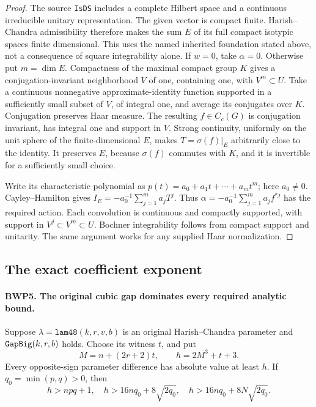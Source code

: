 \documentclass[11pt,a4paper]{article}
\numberwithin{equation}{section}
\theoremstyle{remark}\newtheorem{remark}[theorem]{Remark}
\begin{document}
\begin{proof}
The source \texttt{Is\allowbreak DS} includes a complete Hilbert space and a
continuous irreducible unitary representation.  The given vector is
compact finite.  Harish--Chandra admissibility therefore makes the sum
\(E\) of its full compact isotypic spaces finite dimensional.  This
uses the named inherited foundation stated above, not a consequence
of square integrability alone.  If \(w=0\), take \(\alpha=0\).
Otherwise put \(m=\dim E\).  Compactness of the maximal compact
group \(K\) gives a conjugation-invariant neighborhood \(V\) of
one, containing one, with \(V^m\subset U\).
Take a continuous nonnegative approximate-identity function supported
in a sufficiently small subset of \(V\), of integral one, and
average its conjugates over \(K\).  Conjugation preserves Haar
measure.  The resulting \(f\in C_c(G)\) is conjugation invariant,
has integral one and support in \(V\).  Strong continuity, uniformly
on the unit sphere of the finite-dimensional \(E\), makes
\(T=\sigma(f)|_E\) arbitrarily close to the identity.  It preserves
\(E\), because \(\sigma(f)\) commutes with \(K\), and it is
invertible for a sufficiently small choice.

Write its characteristic polynomial as
\(p(t)=a_0+a_1t+\cdots+a_mt^m\); here \(a_0\ne0\).
Cayley--Hamilton gives
\(I_E=-a_0^{-1}\sum_{j=1}^m a_jT^j\).
Thus \(\alpha=-a_0^{-1}\sum_{j=1}^m a_j f^{*j}\) has
the required action.  Each convolution is continuous and compactly
supported, with support in \(V^j\subset V^m\subset U\).
Bochner integrability follows from compact support and unitarity.
The same argument works for any supplied Haar normalization.
\end{proof}

\subsection{The exact coefficient exponent}

\paragraph{BWP5. The original cubic gap dominates every required analytic bound.}
\label{claim:BWP5}
Suppose \(\lambda=\texttt{lam48}(k,r,v,b)\) is an original
Harish--Chandra parameter and \(\texttt{Gap\allowbreak Big}(k,r,b)\) holds.
Choose its witness \(t\), and put
\[
 M=n+(2r+2)t,\qquad h=2M^3+t+3.
 \tag{BWP.9}
\]
Every opposite-sign parameter difference has absolute value at least
\(h\).  If \(q_0=\min(p,q)>0\), then
\[
 h>npq+1,\quad h>16nq_0+8\sqrt{2q_0},\quad
 h>16nq_0+8N\sqrt{2q_0}.
 \tag{BWP.10}
\]
\end{document}
